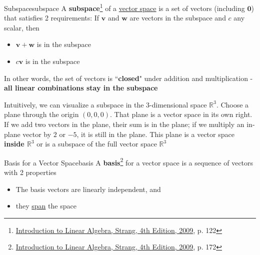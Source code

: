\begin{Definition}{Subspace}{subspace}
    A \textbf{subspace}\footnote{\href{https://trello.com/c/qHJeDNkU}{Introduction to Linear Algebra, Strang, 4th Edition, 2009}, p. 122}
    of a \hyperlink{vector-space}{vector space} is a set of vectors (including $\boldsymbol{0}$) that satisfies 2
    requirements: If $\boldsymbol{v}$ and $\boldsymbol{w}$ are vectors in the subspace and $c$ any scalar, then

    \begin{itemize}
        \item $\boldsymbol{v} + \boldsymbol{w}$ is in the subspace
        \item $c\boldsymbol{v}$ is in the subspace
    \end{itemize}

    In other words, the set of vectors is ``\textbf{closed}" under addition and multiplication - \textbf{all linear combinations
    stay in the subspace}

\end{Definition}

Intuitively, we can visualize a subspace in the 3-dimensional space $\mathbb{R}^3$. Choose a plane through the
origin $(0, 0, 0)$. That plane is a vector space in its own right. If we add two vectors in the plane, their sum is in
the plane; if we multiply an in-plane vector by $2$ or $-5$, it is still in the plane. This plane is a vector space
\textbf{inside $\mathbb{R}^3$} or is a subspace of the full vector space $\mathbb{R}^3$


\begin{Definition}{Basis for a Vector Space}{basis}
    A \textbf{basis}\footnote{\href{https://trello.com/c/qHJeDNkU}{Introduction to Linear Algebra, Strang, 4th Edition, 2009}, p. 172} for a vector space is a sequence of vectors with 2 properties

    \begin{itemize}
        \item The basis vectors are linearly independent, and
        \item they \hyperlink{column-space}{span} the space
    \end{itemize}
\end{Definition}

